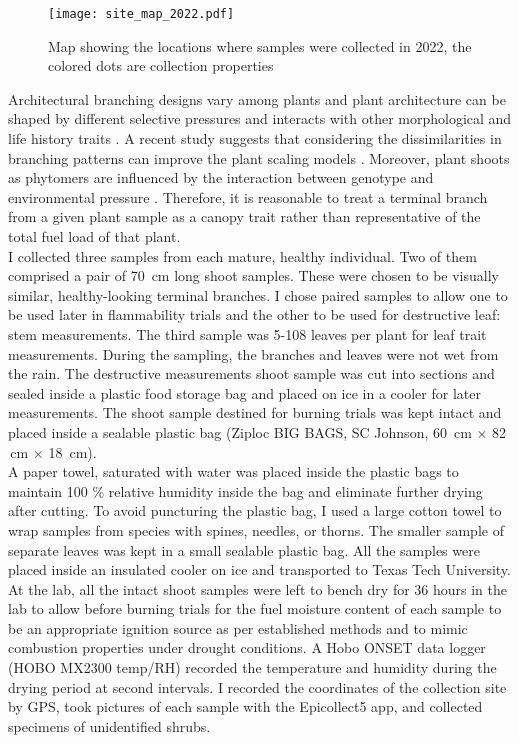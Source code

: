 \documentclass[12pt]{report}
\begin{document}
\begin{figure}
    \centering
    \texttt{[image: site\_map\_2022.pdf]}
    \caption{Map showing the locations where samples were collected in 2022, the colored dots are collection properties}
\end{figure}

Architectural branching designs vary among plants \citep{halle2012tropical} and plant architecture can be shaped by different selective pressures \citep{danell1994browseeffects, schwilk2003flammability} and interacts with other morphological and life history traits \citep{ackerly1998leaf, schwilk2001flammability,archibald2003growing}. A recent study suggests that considering the dissimilarities in branching patterns can improve the plant scaling models \citep{bentley2013empirical}. Moreover, plant shoots as phytomers are influenced by the interaction between genotype and environmental pressure \citep{mcsteen2005shoot, wang2008molecular}. Therefore, it is reasonable to treat a terminal branch from a given plant sample as a canopy trait rather than representative of the total fuel load of that plant.\\

I collected three samples from each mature, healthy individual. Two of them comprised a pair of 70 \,cm long shoot samples. These were chosen to be visually similar, healthy-looking terminal branches. I chose paired samples to allow one to be used later in flammability trials and the other to be used for destructive leaf: stem measurements. The third sample was 5-108 leaves per plant for leaf trait measurements. During the sampling, the branches and leaves were not wet from the rain.  The destructive measurements shoot sample was cut into sections and sealed inside a plastic food storage bag and placed on ice in a cooler for later measurements. The shoot sample destined for burning trials was kept intact and placed inside a sealable plastic bag (Ziploc BIG BAGS, SC Johnson, 60 \,cm × 82 \,cm × 18 \,cm).\\

A paper towel, saturated with water was placed inside the plastic bags to maintain 100 \% relative humidity inside the bag and eliminate further drying after cutting. To avoid puncturing the plastic bag, I used a large cotton towel to wrap samples from species with spines, needles, or thorns. The smaller sample of separate leaves was kept in a small sealable plastic bag. All the samples were placed inside an insulated cooler on ice and transported to Texas Tech University. At the lab, all the intact shoot samples were left to bench dry for 36 hours in the lab to allow before burning trials for the fuel moisture content of each sample to be an appropriate ignition source as per established methods \citep{wyse2016quantitative} and to mimic combustion properties under drought conditions. A Hobo ONSET data logger (HOBO MX2300 temp/RH) recorded the temperature and humidity during the drying period at second intervals. I recorded the coordinates of the collection site by GPS, took pictures of each sample with the Epicollect5 app, and collected specimens of unidentified shrubs.
\end{document}
